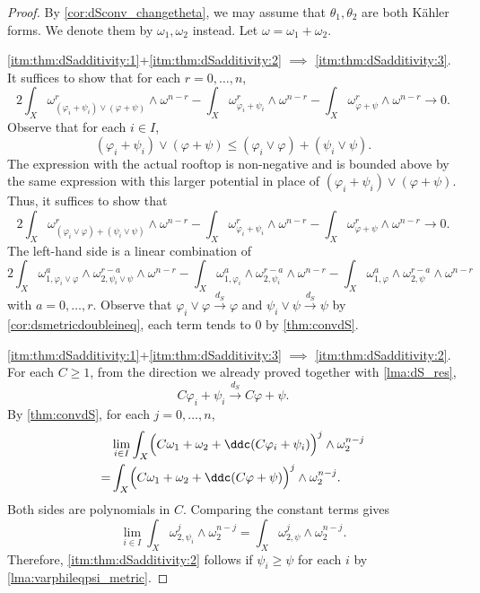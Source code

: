 \begin{proof}
By \cref{cor:dSconv_changetheta}, we may assume that $\theta_1,\theta_2$ are both Kähler forms. We denote them by $\omega_1,\omega_2$ instead. Let $\omega=\omega_1+\omega_2$.

\ref{itm:thm:dSadditivity:1}+\ref{itm:thm:dSadditivity:2} $\implies$ \ref{itm:thm:dSadditivity:3}.
	It suffices to show that for each $r=0,\ldots,n$,
	\[
		2\int_X \omega_{(\varphi_i+\psi_i)\lor(\varphi+\psi)}^r\wedge \omega^{n-r}-\int_X \omega_{\varphi_i+\psi_i}^r\wedge \omega^{n-r}-\int_X \omega_{\varphi+\psi}^r\wedge\omega^{n-r}\to 0.
	\]
	Observe that for each $i\in I$,
	\[
		(\varphi_i+\psi_i)\lor (\varphi+\psi)\leq (\varphi_i\lor \varphi)+(\psi_i \lor \psi).
	\]
	The expression with the actual rooftop is non-negative and is bounded above by the same expression with this larger potential in place of $(\varphi_i+\psi_i)\lor(\varphi+\psi)$. Thus, it suffices to show that
	\[
		2\int_X \omega_{(\varphi_i\lor \varphi)+(\psi_i\lor \psi)}^r\wedge \omega^{n-r}-\int_X \omega_{\varphi_i+\psi_i}^r\wedge \omega^{n-r}-\int_X \omega_{\varphi+\psi}^r\wedge\omega^{n-r}\to 0.
	\]
	The left-hand side is a linear combination of
	\[
		2\int_X \omega_{1,\varphi_i\lor\varphi}^a\wedge \omega_{2,\psi_i\lor\psi}^{r-a}\wedge \omega^{n-r}-\int_X \omega_{1,\varphi_i}^a\wedge \omega_{2,\psi_i}^{r-a} \wedge \omega^{n-r}-\int_X \omega_{1,\varphi}^a\wedge \omega_{2,\psi}^{r-a} \wedge \omega^{n-r}
	\]
	with $a=0,\ldots,r$. Observe that $\varphi_i\lor\varphi\xrightarrow{d_S}\varphi$ and $\psi_i\lor\psi\xrightarrow{d_S}\psi$ by \cref{cor:dsmetricdoubleineq}, each term tends to $0$ by \cref{thm:convdS}.


\ref{itm:thm:dSadditivity:1}+\ref{itm:thm:dSadditivity:3} $\implies$ \ref{itm:thm:dSadditivity:2}. For each $C\geq 1$, from the direction we already proved together with \cref{lma:dS_res},
    \[
    C\varphi_i+\psi_i\xrightarrow{d_{S}} C\varphi+\psi.
    \]
By \cref{thm:convdS}, for each $j=0,\ldots,n$,
\[
\begin{split}
&\lim_{i\in I} \int_X \Bigl(C\omega_1+\omega_2+\ddc(C\varphi_i+\psi_i)\Bigr)^j\wedge \omega_2^{n-j}\\
= &\int_X \Bigl(C\omega_1+\omega_2+\ddc(C\varphi+\psi)\Bigr)^j\wedge \omega_2^{n-j}.
\end{split}
\]
Both sides are polynomials in $C$. Comparing the constant terms gives
\begin{equation}\label{eq:psii_quant_conv}
\lim_{i\in I} \int_X \omega_{2,\psi_i}^j\wedge \omega_2^{n-j}=\int_X \omega_{2,\psi}^j\wedge \omega_2^{n-j}.
\end{equation}
Therefore, \ref{itm:thm:dSadditivity:2} follows if $\psi_i\geq \psi$ for each $i$ by \cref{lma:varphileqpsi_metric}.


\end{proof}
